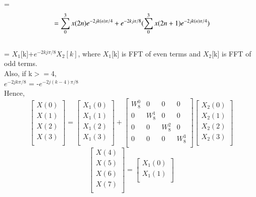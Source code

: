 \documentclass[journal,12pt,twocolumn]{IEEEtran}
\renewcommand\thesection{\arabic{section}}
\begin{document}
\begin{enumerate}[label=\arabic*.,ref=\thesection.\theenumi]
\begin{solution}
\begin{equation}
\end{equation}
\\=
\begin{equation}
	\\
	= \sum_{0}^{3}x(2n)e^{-2jk(n)\pi/4}+e^{-2kj\pi/8}(\sum_{0}^{3}x(2n+1)e^{-2jk(n)\pi/4})
\end{equation}
\\=
$X_1$[k]+$e^{-2kj\pi/8}$$X_2[k]$, where $X_1$[k] is FFT of even terms
and $X_2$[k] is FFT of odd terms.
\\
Also, if k$>=$4,
\\
$e^{-2jk\pi/8}$ = -$e^{-2j(k-4)\pi/8}$ 
\\Hence,
\begin{equation}
\begin{bmatrix}
	X(0) \\ 
	X(1) \\
	X(2) \\
	X(3) \\
\end{bmatrix}
=
\begin{bmatrix}
	X_1(0) \\ 
	X_1(1) \\
	X_1(2) \\
	X_1(3) \\
\end{bmatrix}
+
\begin{bmatrix}
	W_8^{0} & 0 & 0 & 0\\ 
	0 & W_8^{1} & 0 & 0 \\
	0 & 0 & W_8^{2} & 0 \\
	0 & 0 & 0 & W_8^{3} \\
\end{bmatrix}
\begin{bmatrix}
	X_2(0) \\ 
	X_2(1) \\
	X_2(2) \\
	X_2(3) \\
\end{bmatrix}
\end{equation}
\begin{equation}
\begin{bmatrix}
	X(4) \\ 
	X(5) \\
	X(6) \\
	X(7) \\
\end{bmatrix}
=
\begin{bmatrix}
	X_1(0) \\ 
	X_1(1) \\

\end{bmatrix}
\end{equation}$$
\end{solution}
\end{enumerate}
\end{document}
